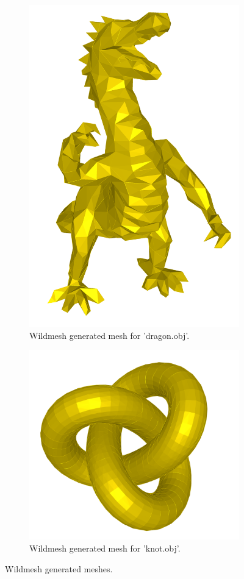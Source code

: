 \begin{figure}[H]
	\centering
	\begin{subfigure}[b]{0.49\linewidth}
		\centering
		\includegraphics[height=0.75\linewidth]{Materials/dragon}
		\caption{Wildmesh generated mesh for 'dragon.obj'.}
	\end{subfigure}
	\hfill
	\begin{subfigure}[b]{0.49\linewidth}
		\centering
		\includegraphics[height=0.75\linewidth]{Materials/knot}
		\caption{Wildmesh generated mesh for 'knot.obj'.}
	\end{subfigure}
	\caption{Wildmesh generated meshes.}
	\label{wildmesh}
\end{figure} 